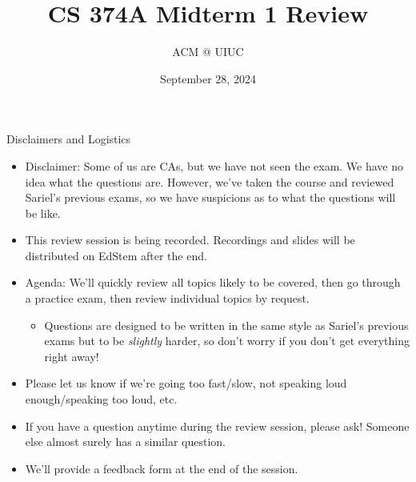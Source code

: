 \documentclass{beamer}
\title[ACM fun]{CS 374A Midterm 1 Review}
\author{ACM @ UIUC}
\date{September 28, 2024}
\begin{document}
\begin{frame}
  \titlepage
\end{frame}

\begin{frame}[t]{Disclaimers and Logistics}
  \begin{itemize}
  \item \alert{Disclaimer:} Some of us are CAs, but we have not seen the exam. We have no idea what the questions are. However, we've taken the course and reviewed Sariel's previous exams, so we have \alert{suspicions} as to what the questions will be like.
  \item This review session is being recorded. Recordings and slides will be distributed on EdStem after the end.
  \item \alert{Agenda:} We'll quickly review all topics likely to be covered, then go through a practice exam, then review individual topics by request.
  \begin{itemize}
      \item Questions are designed to be written in the same style as Sariel's previous exams but to be \textit{slightly} harder, so don't worry if you don't get everything right away!
  \end{itemize}
  \item Please let us know if we're going too fast/slow, not speaking loud enough/speaking too loud, etc.
  \item If you have a question anytime during the review session, please ask! Someone else almost surely has a similar question.
  \item We'll provide a feedback form at the end of the session.
  \end{itemize}
\end{frame}
\end{document}
